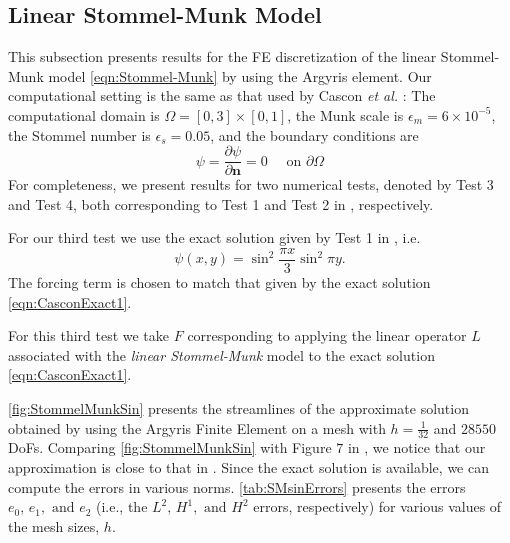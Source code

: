 \subsection{Linear Stommel-Munk Model}\label{sse:SMM}
This subsection presents results for the FE discretization of the linear
Stommel-Munk model \eqref{eqn:Stommel-Munk} by using the Argyris element. Our
computational setting is the same as that used by Cascon \emph{et al.}
\cite{Cascon}: The computational domain is $\Omega = [0,3]\times[0,1]$, the Munk
scale is $\epsilon_m=6\times 10^{-5}$, the Stommel number is $\epsilon_s=0.05$,
and the boundary conditions are
\begin{equation} \label{eqn:SMProb}
  \psi = \frac{\partial \psi}{\partial \mathbf{n}}=0 \quad \text{ on } \partial\Omega
\end{equation}
For completeness, we present results for two numerical tests, denoted by Test 3
and Test 4, both corresponding to Test 1 and Test 2 in \cite{Cascon},
respectively.

For our third test we use the exact solution given by Test 1 in \cite{Cascon},
i.e.
\begin{equation}
  \psi(x,y) = \sin^2 \frac{\pi x}{3} \sin^2 \pi y.
  \label{eqn:CasconExact1}
\end{equation}
The forcing term is chosen to match that given by the exact solution
\eqref{eqn:CasconExact1}.

For this third test we take $F$ corresponding to applying the linear operator
$L$ associated with the \emph{linear Stommel-Munk} model to the exact solution
\eqref{eqn:CasconExact1}.

\autoref{fig:StommelMunkSin} presents the streamlines of the approximate
solution obtained by using the Argyris Finite Element on a mesh with
$h=\frac{1}{32}$ and $28550$ DoFs. Comparing \autoref{fig:StommelMunkSin} with
Figure $7$ in \cite{Myers}, we notice that our approximation is close to that in
\cite{Myers}. Since the exact solution is available, we can compute the errors
in various norms. \autoref{tab:SMsinErrors} presents the errors $e_0,\, e_1,
\text{ and } e_2$ (i.e., the $L^2,\, H^1, \text{ and } H^2$ errors,
respectively) for various values of the mesh sizes, $h$.

